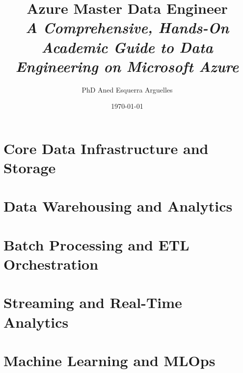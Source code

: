 \documentclass[11pt,a4paper,oneside]{book}
\title{\Huge \textbf{Azure Master Data Engineer}\\[1em]
\Large \textit{A Comprehensive, Hands-On Academic Guide to Data Engineering on Microsoft Azure}}
\author{PhD Aned Esquerra Arguelles}
\date{\today}
\begin{document}
\frontmatter



\tableofcontents
\listoffigures
\listoftables

\mainmatter

\setcounter{chapter}{-1}


\part{Core Data Infrastructure and Storage}





\part{Data Warehousing and Analytics}





\part{Batch Processing and ETL Orchestration}





\part{Streaming and Real-Time Analytics}





\part{Machine Learning and MLOps}




\end{document}
